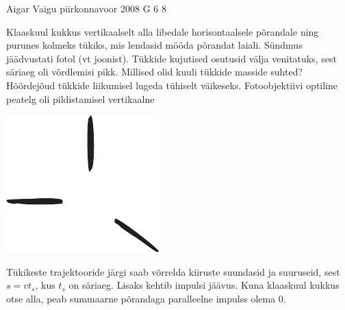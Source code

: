 {Aigar Vaigu} %
{piirkonnavoor} %
{2008} %
{G 6} %
{8} %
{
\ifStatement
Klaaskuul kukkus vertikaalselt alla libedale horisontaalsele põrandale ning purunes kolmeks tükiks, mis lendasid mööda põrandat laiali. Sündmus jäädvustati fotol (vt joonist). Tükkide kujutised osutusid välja venitatuks, sest säriaeg oli võrdlemisi pikk. Millised olid kuuli tükkide masside suhted? Hõõrdejõud tükkide liikumisel lugeda tühiselt väikeseks. Fotoobjektiivi optiline peatelg oli pildistamisel vertikaalne

\begin{center}
	\includegraphics[width=0.6\linewidth]{2008-v2g-06-yl}
\end{center}
\fi


\ifHint
Tükikeste trajektooride järgi saab võrrelda kiiruste suundasid ja suuruseid, sest $s = vt_s$, kus $t_s$ on säriaeg. Lisaks kehtib impulsi jäävus. Kuna klaaskuul kukkus otse alla, peab summaarne põrandaga paralleelne impulss olema 0.
\fi


}
